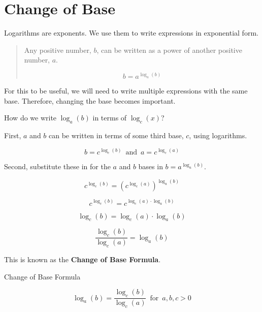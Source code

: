\documentclass{ximera}
\begin{document}
\section{Change of Base}


Logarithms are exponents.  We use them to write expressions in exponential form.



\begin{quote}

Any positive number, $b$, can be written as a power of another positive number, $a$.

\[    b = a^{\log_a(b)}  \]

\end{quote}

For this to be useful, we will need to write multiple expressions with the same base. Therefore, changing the base becomes important.

How do we write $\log_a(b)$ in terms of $\log_c(x)$?




First, $a$ and $b$ can be written in terms of some third base, $c$, using logarithms.


\[    b = c^{\log_c(b)} \,   \text{ and } \,      a = c^{\log_c(a)}      \]



Second, substitute these in for the $a$ and $b$ bases in $b = a^{\log_a(b)}$.



\[   c^{\log_c(b)} = \left(c^{\log_c(a)}\right)^{\log_a(b)}  \]



\[   c^{\log_c(b)} = c^{\log_c(a) \cdot \log_a(b)}  \]



\[   \log_c(b) = \log_c(a) \cdot \log_a(b)  \]


\[   \frac{\log_c(b)}{\log_c(a)} =  \log_a(b)  \]


This is known as the \textbf{Change of Base Formula}.








\begin{template}  Change of Base Formula

\[   \log_a(b)  =  \frac{\log_c(b)}{\log_c(a)}        \, \text{ for } \, a, b, c  > 0        \]


\end{template}
\end{document}

